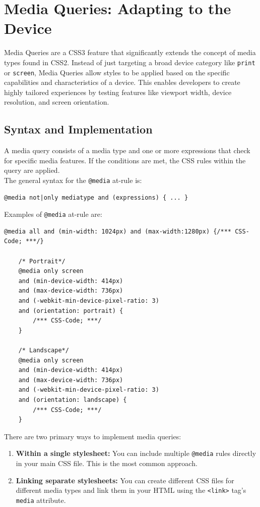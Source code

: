 \documentclass{scrbook}
\begin{document}
\chapter{Media Queries: Adapting to the Device}

Media Queries are a CSS3 feature that significantly extends the concept of media types found in CSS2. Instead of just targeting a broad device category like \texttt{print} or \texttt{screen}, Media Queries allow styles to be applied based on the specific capabilities and characteristics of a device. This enables developers to create highly tailored experiences by testing features like viewport width, device resolution, and screen orientation.

\section{Syntax and Implementation}

A media query consists of a media type and one or more expressions that check for specific media features. If the conditions are met, the CSS rules within the query are applied. \\

The general syntax for the \texttt{@media} at-rule is:

\begin{lstlisting}[caption={@media at-rule general syntax}]
    @media not|only mediatype and (expressions) { ... }
\end{lstlisting}

Examples of \texttt{@media} at-rule are:

\begin{lstlisting}[caption={@media at-rule examples}]
    @media all and (min-width: 1024px) and (max-width:1280px) {/*** CSS-Code; ***/}

    /* Portrait*/
    @media only screen
    and (min-device-width: 414px)
    and (max-device-width: 736px)
    and (-webkit-min-device-pixel-ratio: 3)
    and (orientation: portrait) {
        /*** CSS-Code; ***/
    }
    
    /* Landscape*/
    @media only screen
    and (min-device-width: 414px)
    and (max-device-width: 736px)
    and (-webkit-min-device-pixel-ratio: 3)
    and (orientation: landscape) {
        /*** CSS-Code; ***/
    }
\end{lstlisting}

There are two primary ways to implement media queries:

\begin{enumerate}
    \item \textbf{Within a single stylesheet:} You can include multiple \texttt{@media} rules directly in your main CSS file. This is the most common approach.
    
    \item \textbf{Linking separate stylesheets:} You can create different CSS files for different media types and link them in your HTML using the \texttt{<link>} tag's \texttt{media} attribute.
\end{enumerate}
\end{document}
